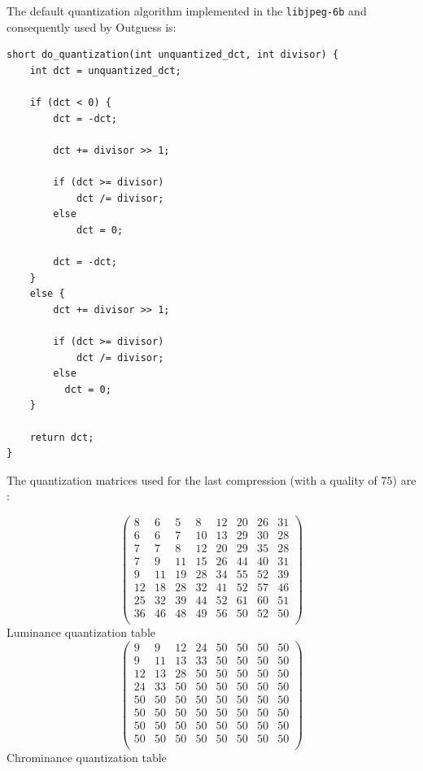 \documentclass{article}
\begin{document}
The default quantization algorithm implemented in the \texttt{libjpeg-6b} and consequently used by Outguess is:
\begin{verbatim}
short do_quantization(int unquantized_dct, int divisor) {
    int dct = unquantized_dct;

    if (dct < 0) {
        dct = -dct;

        dct += divisor >> 1;

        if (dct >= divisor)
            dct /= divisor;
        else
            dct = 0;

        dct = -dct;
    }
    else {
        dct += divisor >> 1;

        if (dct >= divisor)
            dct /= divisor;
        else
          dct = 0;
    }

    return dct;
}
\end{verbatim}

The quantization matrices used for the last compression (with a quality of $75$) are :
\begin{center}
	\[
		\begin{pmatrix}
			8 & 6 & 5 & 8 & 12 & 20 & 26 & 31 \\
			6 & 6 & 7 & 10 & 13 & 29 & 30 & 28 \\
			7 & 7 & 8 & 12 & 20 & 29 & 35 & 28 \\
			7 & 9 & 11 & 15 & 26 & 44 & 40 & 31 \\
			9 & 11 & 19 & 28 & 34 & 55 & 52 & 39 \\
			12 & 18 & 28 & 32 & 41 & 52 & 57 & 46 \\
			25 & 32 & 39 & 44 & 52 & 61 & 60 & 51 \\
			36 & 46 & 48 & 49 & 56 & 50 & 52 & 50 \\
		\end{pmatrix}
	\]
	Luminance quantization table \\
	\[
		\begin{pmatrix}
			9 & 9 & 12 & 24 & 50 & 50 & 50 & 50 \\
			9 & 11 & 13 & 33 & 50 & 50 & 50 & 50 \\
			12 & 13 & 28 & 50 & 50 & 50 & 50 & 50 \\
			24 & 33 & 50 & 50 & 50 & 50 & 50 & 50 \\
			50 & 50 & 50 & 50 & 50 & 50 & 50 & 50 \\
			50 & 50 & 50 & 50 & 50 & 50 & 50 & 50 \\
			50 & 50 & 50 & 50 & 50 & 50 & 50 & 50 \\
			50 & 50 & 50 & 50 & 50 & 50 & 50 & 50 \\
		\end{pmatrix}
	\]
	Chrominance quantization table
\end{center}
\end{document}
